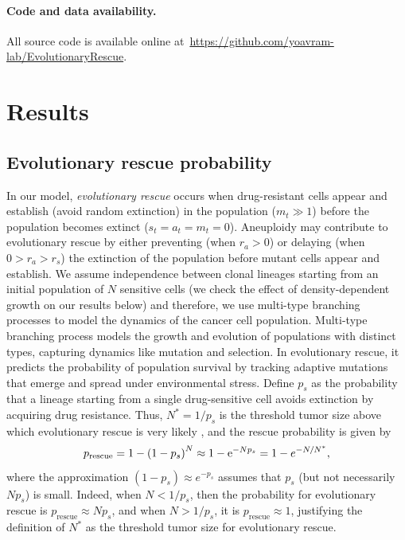 \documentclass[12pt]{extarticle}
\newcommand{\e}{{\rm e}}
\newcommand{\presc}{p_\text{rescue}}
\renewcommand{\Delta}{r}
\begin{document}

\paragraph{Code and data availability.} All source code is available online at~\url{https://github.com/yoavram-lab/EvolutionaryRescue}.


\section*{Results}


\subsection*{Evolutionary rescue probability}

In our model, \emph{evolutionary rescue} occurs when drug-resistant cells appear and establish (avoid random extinction) in the population  ($m_t \gg 1$) before the population becomes extinct ($s_t=a_t=m_t=0$). %
Aneuploidy may contribute to evolutionary rescue by either preventing (when $\Delta_a>0$) or delaying (when $0>\Delta_a>\Delta_s$) the extinction of the population before mutant cells appear and establish.
We assume independence between clonal lineages starting from an initial population of $N$ sensitive cells (we check the effect of density-dependent growth on our results below) and therefore, we use multi-type branching processes to model the dynamics of the cancer cell population. Multi-type branching process models the growth and evolution of populations with distinct types, capturing dynamics like mutation and selection. In evolutionary rescue, it predicts the probability of population survival by tracking adaptive mutations that emerge and spread under environmental stress. %
Define $p_s$ as the probability that a lineage starting from a single drug-sensitive cell avoids extinction by acquiring drug resistance.
Thus, $N^*=1/p_s$ is the threshold tumor size above which evolutionary rescue is very likely \citep{iwasa2003evolutionary}, and the rescue probability is given by 
\begin{equation}\label{eq:rescue_prob} 
\presc = 
1-\left(1-p_s\right)^N \approx
1-\e^{-Np_s} = 
1-e^{-N/N^*} ,
\end{equation}
where the approximation $(1-p_s)\approx e^{-p_s}$ assumes that $p_s$ (but not necessarily $N p_s$) is small.
Indeed, when $N<1/p_s$, then the probability for evolutionary rescue is $\presc \approx N p_s$, and when $N > 1/p_s$, it is $\presc \approx 1$, justifying the definition of $N^*$ as the threshold tumor size for evolutionary rescue. 
\end{document}
